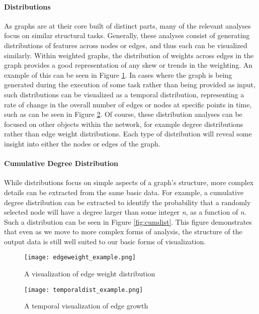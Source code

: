\paragraph{Distributions}
As graphs are at their core built of distinct parts, many of the relevant analyses focus on similar structural tasks. Generally, these analyses consist of generating distributions of features across nodes or edges, and thus each can be visualized similarly. Within weighted graphs, the distribution of weights across edges in the graph provides a good representation of any skew or trends in the weighting. An example of this can be seen in Figure \ref{fig:edgeweight}. In cases where the graph is being generated during the execution of some task rather than being provided as input, such distributions can be visualized as a temporal distribution, representing a rate of change in the overall number of edges or nodes at specific points in time, such as can be seen in Figure \ref{fig:temporaldist}. Of course, these distribution analyses can be focused on other objects within the network, for example degree distributions rather than edge weight distributions. Each type of distribution will reveal some insight into either the nodes or edges of the graph. 

\paragraph{Cumulative Degree Distribution}
While distributions focus on simple aspects of a graph's structure, more complex details can be extracted from the same basic data. For example, a cumulative degree distribution can be extracted to identify the probability that a randomly selected node will have a degree larger than some integer \emph{n}, as a function of \emph{n}. Such a distribution can be seen in Figure \ref{fig:cumdist}. This figure demonstrates that even as we move to more complex forms of analysis, the structure of the output data is still well suited to our basic forms of visualization. 

\begin{figure}
	\centering
	\texttt{[image: edgeweight\_example.png]}
	\caption{A visualization of edge weight distribution \citep{KONECT}}
	\label{fig:edgeweight}
\end{figure}

\begin{figure}
	\centering
	\texttt{[image: temporaldist\_example.png]}
	\caption{A temporal visualization of edge growth \citep{KONECT}}
	\label{fig:temporaldist}
\end{figure}

